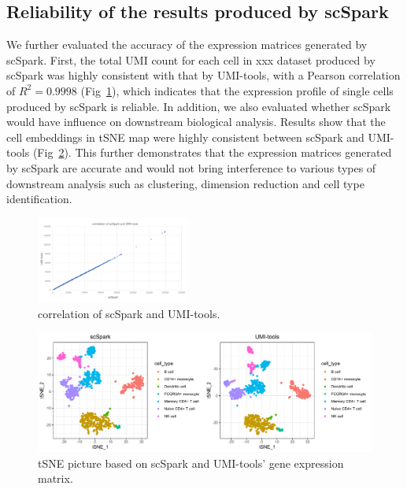\documentclass[conference]{IEEEtran}
\begin{document}
\subsection{Reliability of the results produced by scSpark} 
We further evaluated the accuracy of the expression matrices generated by scSpark. First, the total UMI count for each cell in xxx dataset produced by scSpark was highly consistent with that by UMI-tools, with a Pearson correlation of $R^{2} = 0.9998$ (Fig~\ref{fig9}), which indicates that the expression profile of single cells produced by scSpark is reliable. In addition, we also evaluated whether scSpark would have influence on downstream biological analysis. Results show that the cell embeddings in tSNE map were highly consistent between scSpark and UMI-tools (Fig~\ref{fig10}). This further demonstrates that the expression matrices generated by scSpark are accurate and would not bring interference to various types of downstream analysis such as clustering, dimension reduction and cell type identification.
\begin{figure}
  \includegraphics[width=0.45\textwidth]{fig9.pdf}
  \caption{correlation of scSpark and UMI-tools.} \label{fig9}
\end{figure}
\begin{figure}
  \includegraphics[width=\textwidth]{fig10.pdf}
  \caption{tSNE picture based on scSpark and UMI-tools' gene expression matrix.} \label{fig10}
\end{figure}
\end{document}
